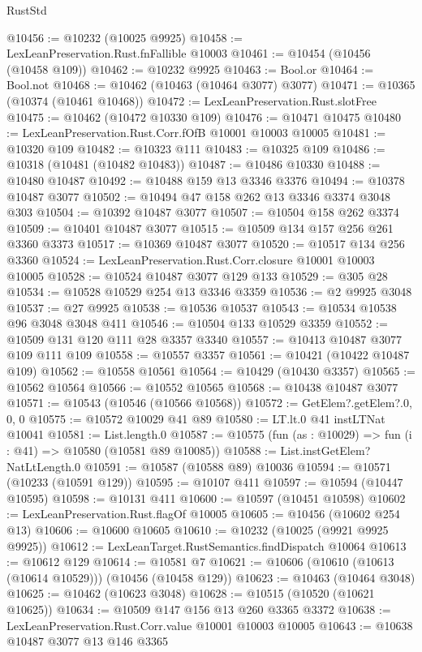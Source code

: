\begin{lexlean}{RustStd}
\begin{coremodule}
@10456 := @10232 (@10025 @9925)
@10458 := LexLeanPreservation.Rust.fnFallible @10003
@10461 := @10454 (@10456 (@10458 @109))
@10462 := @10232 @9925
@10463 := Bool.or
@10464 := Bool.not
@10468 := @10462 (@10463 (@10464 @3077) @3077)
@10471 := @10365 (@10374 (@10461 @10468))
@10472 := LexLeanPreservation.Rust.slotFree
@10475 := @10462 (@10472 @10330 @109)
@10476 := @10471 @10475
@10480 := LexLeanPreservation.Rust.Corr.fOfB @10001 @10003 @10005
@10481 := @10320 @109
@10482 := @10323 @111
@10483 := @10325 @109
@10486 := @10318 (@10481 (@10482 @10483))
@10487 := @10486 @10330
@10488 := @10480 @10487
@10492 := @10488 @159 @13 @3346 @3376
@10494 := @10378 @10487 @3077
@10502 := @10494 @47 @158 @262 @13 @3346 @3374 @3048 @303
@10504 := @10392 @10487 @3077
@10507 := @10504 @158 @262 @3374
@10509 := @10401 @10487 @3077
@10515 := @10509 @134 @157 @256 @261 @3360 @3373
@10517 := @10369 @10487 @3077
@10520 := @10517 @134 @256 @3360
@10524 := LexLeanPreservation.Rust.Corr.closure @10001 @10003 @10005
@10528 := @10524 @10487 @3077 @129 @133
@10529 := @305 @28
@10534 := @10528 @10529 @254 @13 @3346 @3359
@10536 := @2 @9925 @3048
@10537 := @27 @9925
@10538 := @10536 @10537
@10543 := @10534 @10538 @96 @3048 @3048 @411
@10546 := @10504 @133 @10529 @3359
@10552 := @10509 @131 @120 @111 @28 @3357 @3340
@10557 := @10413 @10487 @3077 @109 @111 @109
@10558 := @10557 @3357
@10561 := @10421 (@10422 @10487 @109)
@10562 := @10558 @10561
@10564 := @10429 (@10430 @3357)
@10565 := @10562 @10564
@10566 := @10552 @10565
@10568 := @10438 @10487 @3077
@10571 := @10543 (@10546 (@10566 @10568))
@10572 := GetElem?.getElem?.{0, 0, 0}
@10575 := @10572 @10029 @41 @89
@10580 := LT.lt.{0} @41 instLTNat @10041
@10581 := List.length.{0}
@10587 := @10575 (fun (as : @10029) => fun (i : @41) => @10580 (@10581 @89 @10085))
@10588 := List.instGetElem?NatLtLength.{0}
@10591 := @10587 (@10588 @89) @10036
@10594 := @10571 (@10233 (@10591 @129))
@10595 := @10107 @411
@10597 := @10594 (@10447 @10595)
@10598 := @10131 @411
@10600 := @10597 (@10451 @10598)
@10602 := LexLeanPreservation.Rust.flagOf @10005
@10605 := @10456 (@10602 @254 @13)
@10606 := @10600 @10605
@10610 := @10232 (@10025 (@9921 @9925 @9925))
@10612 := LexLeanTarget.RustSemantics.findDispatch @10064
@10613 := @10612 @129
@10614 := @10581 @7
@10621 := @10606 (@10610 (@10613 (@10614 @10529))) (@10456 (@10458 @129))
@10623 := @10463 (@10464 @3048)
@10625 := @10462 (@10623 @3048)
@10628 := @10515 (@10520 (@10621 @10625))
@10634 := @10509 @147 @156 @13 @260 @3365 @3372
@10638 := LexLeanPreservation.Rust.Corr.value @10001 @10003 @10005
@10643 := @10638 @10487 @3077 @13 @146 @3365

\end{coremodule}
\end{lexlean}

